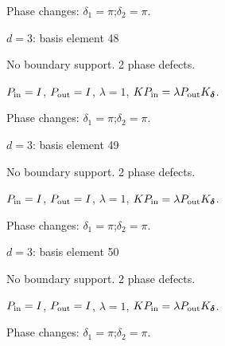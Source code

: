 \par\smallskip\begin{minipage}{.98\linewidth}\small Phase changes: $\delta_{1}=\pi$;\quad $\delta_{2}=\pi$.\end{minipage}
\vfill
{\footnotesize\texttt{}}
\newpage
{}
{\Large $d=3$: basis element 48}\par
No boundary support. 2 phase defects.
\begin{center}
\end{center}
\vspace{-1mm}
$P_{\rm in}=I$, \quad $P_{\rm out}=I$, \quad $\lambda=1$, \qquad $K P_{\rm in}=\lambda P_{\rm out}K_{\boldsymbol\delta}$.
\par\smallskip\begin{minipage}{.98\linewidth}\small Phase changes: $\delta_{1}=\pi$;\quad $\delta_{2}=\pi$.\end{minipage}
\vfill
{\footnotesize\texttt{}}
\newpage
{}
{\Large $d=3$: basis element 49}\par
No boundary support. 2 phase defects.
\begin{center}
\end{center}
\vspace{-1mm}
$P_{\rm in}=I$, \quad $P_{\rm out}=I$, \quad $\lambda=1$, \qquad $K P_{\rm in}=\lambda P_{\rm out}K_{\boldsymbol\delta}$.
\par\smallskip\begin{minipage}{.98\linewidth}\small Phase changes: $\delta_{1}=\pi$;\quad $\delta_{2}=\pi$.\end{minipage}
\vfill
{\footnotesize\texttt{}}
\newpage
{}
{\Large $d=3$: basis element 50}\par
No boundary support. 2 phase defects.
\begin{center}
\end{center}
\vspace{-1mm}
$P_{\rm in}=I$, \quad $P_{\rm out}=I$, \quad $\lambda=1$, \qquad $K P_{\rm in}=\lambda P_{\rm out}K_{\boldsymbol\delta}$.
\par\smallskip\begin{minipage}{.98\linewidth}\small Phase changes: $\delta_{1}=\pi$;\quad $\delta_{2}=\pi$.\end{minipage}
